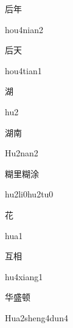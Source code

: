 \begin{multicols*}{2}
\begin{verbete}{后年}
\begin{pronuncia}{hou4nian2}
\end{pronuncia}
\end{verbete}

\begin{verbete}{后天}
\begin{pronuncia}{hou4tian1}
\end{pronuncia}
\end{verbete}

\begin{verbete}[hu2]{湖}
\begin{pronuncia}{hu2}
\end{pronuncia}
\end{verbete}

\begin{verbete}[Hu2nan2]{湖南}
\begin{pronuncia}{Hu2nan2}
\end{pronuncia}
\end{verbete}

\begin{verbete}[hu2li0hu2tu0]{糊里糊涂}
\begin{pronuncia}{hu2li0hu2tu0}
\end{pronuncia}
\end{verbete}

\begin{verbete}[hua1]{花}
\begin{pronuncia}{hua1}
\end{pronuncia}
\end{verbete}

\begin{verbete}[hu4xiang1]{互相}
\begin{pronuncia}{hu4xiang1}
\end{pronuncia}
\end{verbete}

\begin{verbete}{华盛顿}
\begin{pronuncia}{Hua2sheng4dun4}
\end{pronuncia}
\end{verbete}


\end{multicols*}
